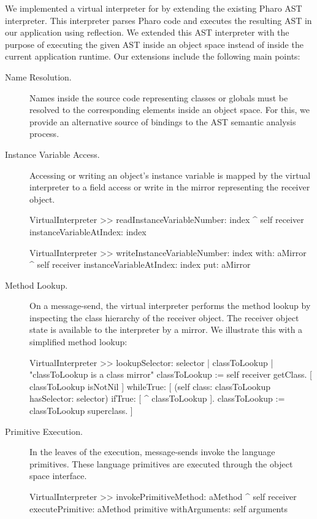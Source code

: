 We implemented a virtual interpreter for \Vtt by extending the existing Pharo AST interpreter. This interpreter parses Pharo code and executes the resulting AST in our application using reflection. We extended this AST interpreter with the purpose of executing the given AST inside an object space instead of inside the current application runtime. Our extensions include the following main points:

\begin{description}
\item[Name Resolution.] Names inside the source code representing \eg classes or globals must be resolved to the corresponding elements inside an object space. For this, we provide an alternative source of bindings to the AST semantic analysis process.

\item[Instance Variable Access.] Accessing or writing an object's instance variable is mapped by the virtual interpreter to a field access or write in the mirror representing the receiver object.

\begin{code}
VirtualInterpreter >> readInstanceVariableNumber: index
    ^ self receiver instanceVariableAtIndex: index
    
VirtualInterpreter >> writeInstanceVariableNumber: index with: aMirror
    ^ self receiver instanceVariableAtIndex: index put: aMirror
\end{code}

\item[Method Lookup.] On a message-send, the virtual interpreter performs the method lookup by inspecting the class hierarchy of the receiver object. The receiver object state is available to the interpreter by a mirror. We illustrate this with a simplified method lookup:

\begin{code}
VirtualInterpreter >> lookupSelector: selector
    | classToLookup |
    "classToLookup is a class mirror"
    classToLookup := self receiver getClass.
    [ classToLookup isNotNil ] whileTrue: [
        (self class: classToLookup hasSelector: selector)
        	    ifTrue: [ ^ classToLookup ].
	classToLookup := classToLookup superclass.
    ]
\end{code}

\item[Primitive Execution.] In the leaves of the execution, message-sends invoke the language primitives. These language primitives are executed through the object space interface.

\begin{code}
VirtualInterpreter >> invokePrimitiveMethod: aMethod
    ^ self receiver
         executePrimitive: aMethod primitive
         withArguments: self arguments
\end{code}

\end{description}

